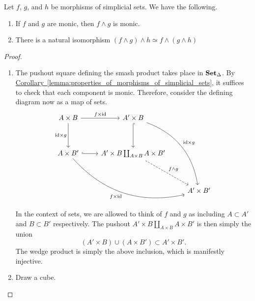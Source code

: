 \documentclass[main.tex]{subfiles}
\begin{document}
\begin{lemma}
  \label{lemma:facts_about_smash_product}
  Let $f$, $g$, and $h$ be morphisms of simplicial sets. We have the following.
  \begin{enumerate}
    \item If $f$ and $g$ are monic, then $f \wedge g$ is monic.

    \item There is a natural isomorphism $(f \wedge g) \wedge h \simeq f \wedge (g \wedge h)$
  \end{enumerate}
\end{lemma}
\begin{proof}
  \leavevmode
  \begin{enumerate}
    \item The pushout square defining the smash product takes place in $\operatorname{\mathbf{Set}_{\Delta}}$. By \hyperref[lemma:properties_of_morphisms_of_simplicial_sets]{Corollary~\ref*{lemma:properties_of_morphisms_of_simplicial_sets}}, it suffices to check that each component is monic. Therefore, consider the defining diagram now as a map of sets.
      \begin{equation*}
        \begin{tikzcd}[row sep=huge]
          A \times B
          \arrow[r, "f \times \id"]
          \arrow[d, swap, "\id \times g"]
          & A' \times B
          \arrow[ddr, bend left, "\id \times g"]
          \arrow[d, hookrightarrow]
          \\
          A \times B'
          \arrow[r, hookrightarrow]
          \arrow[rrd, swap, bend right, "f \times \id"]
          & A' \times B \coprod_{A \times B} A \times B'
          \arrow[dr, dashed, "f \wedge g"]
          \\
          && A' \times B'
        \end{tikzcd}
      \end{equation*}
      In the context of sets, we are allowed to think of $f$ and $g$ as including $A \subset A'$ and $B \subset B'$ respectively. The pushout $A' \times B \coprod_{A \times B} A \times B'$ is then simply the union
      \begin{equation*}
        (A' \times B) \cup (A \times B') \subset A' \times B'.
      \end{equation*}
      The wedge product is simply the above inclusion, which is manifestly injective.

    \item Draw a cube.
  \end{enumerate}
\end{proof}
\end{document}
